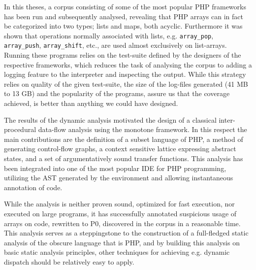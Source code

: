 

In this theses, a corpus consisting of some of the most popular PHP frameworks has been run and subsequently analysed, revealing that PHP arrays can in fact be categorized into two types; lists and maps, both acyclic. Furthermore it was shown that operations normally associated with lists, e.g. \texttt{array\_pop}, \texttt{array\_push}, \texttt{array\_shift}, etc., are used almost exclusively on list-arrays. Running these programs relies on the test-suite defined by the designers of the respective frameworks, which reduces the task of analysing the corpus to adding a logging feature to the interpreter and inspecting the output. While this strategy relies on quality of the given test-suite, the size of the log-files generated (41 MB to 13 GB) and the popularity of the programs, assure us that the coverage achieved, is better than anything we could have designed.


The results of the dynamic analysis motivated the design of a classical inter-procedural data-flow analysis using the monotone framework. In this respect the main contributions  are the definition of a subset language of PHP, a method of generating control-flow graphs, a context sensitive lattice expressing abstract states, and a set of argumentatively sound transfer functions. This analysis has been integrated into one of the most popular IDE for PHP programming, utilizing the AST generated by the environment and allowing instantaneous annotation of code. 

While the analysis is neither proven sound, optimized for fast execution, nor executed on large programs, it has successfully annotated suspicious usage of arrays on code, rewritten to P0, discovered in the corpus in a reasonable time. This analysis serves as a steppingstone to the construction of a full-fledged static analysis of the obscure language that is PHP, and by building this analysis on basic static analysis principles, other techniques for achieving e.g. dynamic dispatch should be relatively easy to apply. 








